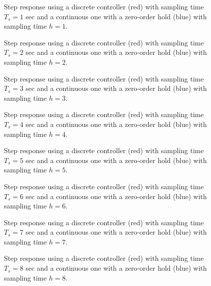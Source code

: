 \begin{figure}[H]\centering
	\centering
	\scalebox{1}{}
  \caption{Step response using a discrete controller (red) with sampling time
    $T_s = 1$ sec and a continuous one with a zero-order hold (blue) with
    sampling time $h=1$.}
  \label{fig:Q8.1}
\end{figure}

\begin{figure}[H]\centering
	\centering
	\scalebox{1}{}
  \caption{Step response using a discrete controller (red) with sampling time
    $T_s = 2$ sec and a continuous one with a zero-order hold (blue) with
    sampling time $h=2$.}
  \label{fig:Q8.2}
\end{figure}

\begin{figure}[H]\centering
	\centering
	\scalebox{1}{}
  \caption{Step response using a discrete controller (red) with sampling time
    $T_s = 3$ sec and a continuous one with a zero-order hold (blue) with
    sampling time $h=3$.}
  \label{fig:Q8.3}
\end{figure}

\begin{figure}[H]\centering
	\centering
	\scalebox{1}{}
  \caption{Step response using a discrete controller (red) with sampling time
    $T_s = 4$ sec and a continuous one with a zero-order hold (blue) with
    sampling time $h=4$.}
  \label{fig:Q8.4}
\end{figure}

\begin{figure}[H]\centering
	\centering
	\scalebox{1}{}
  \caption{Step response using a discrete controller (red) with sampling time
    $T_s = 5$ sec and a continuous one with a zero-order hold (blue) with
    sampling time $h=5$.}
  \label{fig:Q8.5}
\end{figure}

\begin{figure}[H]\centering
	\centering
	\scalebox{1}{}
  \caption{Step response using a discrete controller (red) with sampling time
    $T_s = 6$ sec and a continuous one with a zero-order hold (blue) with
    sampling time $h=6$.}
  \label{fig:Q8.6}
\end{figure}

\begin{figure}[H]\centering
	\centering
	\scalebox{1}{}
  \caption{Step response using a discrete controller (red) with sampling time
    $T_s = 7$ sec and a continuous one with a zero-order hold (blue) with
    sampling time $h=7$.}
  \label{fig:Q8.7}
\end{figure}

\begin{figure}[H]\centering
	\centering
	\scalebox{1}{}
  \caption{Step response using a discrete controller (red) with sampling time
    $T_s = 8$ sec and a continuous one with a zero-order hold (blue) with
    sampling time $h=8$.}
  \label{fig:Q8.8}
\end{figure}
